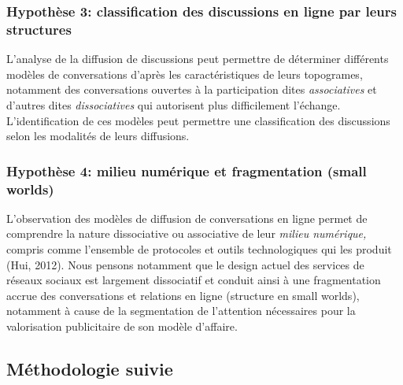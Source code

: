 \subsubsection{Hypoth\`ese 3: classification des discussions en ligne par leurs structures} 

L{\textquoteright}analyse de la diffusion de discussions peut permettre de d\'eterminer diff\'erents mod\`eles de conversations d{\textquoteright}apr\`es les caract\'eristiques de leurs topogrames, notamment des conversations ouvertes \`a la participation dites \textit{associatives }et d{\textquoteright}autres dites \textit{dissociatives} qui autorisent plus difficilement l{\textquoteright}\'echange. L{\textquoteright}identification de ces mod\`eles peut permettre une classification des discussions selon les modalit\'es de leurs diffusions.  

\subsubsection{Hypoth\`ese 4: milieu num\'erique et fragmentation (small worlds)} 

L{\textquoteright}observation des mod\`eles de diffusion de conversations en ligne permet de comprendre la nature dissociative ou associative de leur \textit{milieu num\'erique, }compris comme l{\textquoteright}ensemble de protocoles et outils technologiques qui les produit (Hui, 2012). Nous pensons notamment que le design actuel des services de r\'eseaux sociaux est largement dissociatif et conduit ainsi \`a une fragmentation accrue des conversations et relations en ligne (structure en small worlds), notamment \`a cause de la segmentation de l{\textquoteright}attention n\'ecessaires pour la valorisation publicitaire de son mod\`ele d{\textquoteright}affaire.  


\subsection{M\'ethodologie suivie} 

